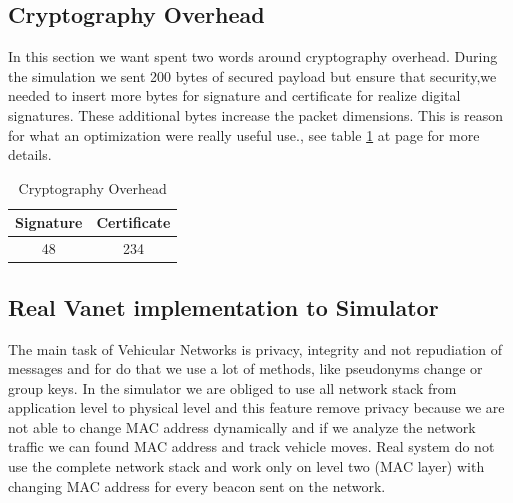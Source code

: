 \subsection{Cryptography Overhead}\label{sec:CryptographyOverhead}
In this section we want spent two words around cryptography overhead. During the simulation we sent 200 bytes of secured payload but ensure that security,we needed to insert more bytes for signature and certificate for realize digital signatures. These additional bytes  increase the packet dimensions. This is reason for what an optimization were really useful use.\cite{calandriello}, see table \ref{tab:CryptographyOverhead} at page \pageref{tab:CryptographyOverhead} for more details.
\begin{table}[!ht]
	\centering
	\caption{Cryptography Overhead}
	\begin{tabular}{|c|c|}
	\hline\hline 
	\textbf{Signature} & \textbf{Certificate}\\
	\hline
		48 & 234\\
	\hline
	\hline     %
 	\end{tabular} 
	\label{tab:CryptographyOverhead}
\end{table}
\subsection{Real Vanet implementation to Simulator}
The main task of Vehicular Networks is privacy, integrity and not repudiation of messages and for do that we use a lot of methods, like pseudonyms change or group keys. In the simulator we are obliged to use all network stack from application level to physical level and this feature remove privacy because we are not able to change MAC address dynamically and if we analyze the network traffic we can found MAC address and track vehicle moves. Real system do not use the complete network stack and work only on level two (MAC layer) with changing MAC address for every beacon sent on the network.
